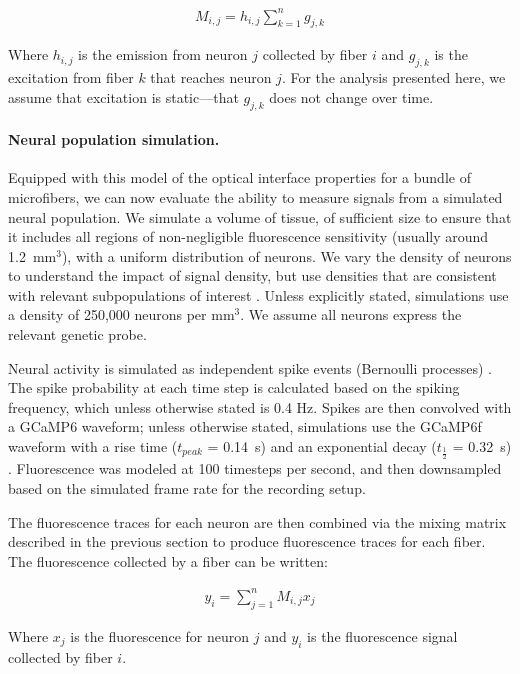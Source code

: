 \begin{align}
M_{i, j} = h_{i, j} \sum_{k = 1}^n g_{j, k}	
\end{align}


Where $h_{i, j}$ is the emission from neuron $j$ collected by fiber $i$ and $g_{j, k}$ is the excitation from fiber $k$ that reaches neuron $j$. For the analysis presented here, we assume that excitation is static---that $g_{j, k}$ does not change over time.

\paragraph{Neural population simulation.} Equipped with this model of the optical interface properties for a bundle of microfibers, we can now evaluate the ability to measure signals from a simulated neural population. We simulate a volume of tissue, of sufficient size to ensure that it includes all regions of non-negligible fluorescence sensitivity (usually around 1.2~mm$^3$), with a uniform distribution of neurons. We vary the density of neurons to understand the impact of signal density, but use densities that are consistent with relevant subpopulations of interest \cite{Walton:2012fj,KosubekLanger:2017jb}. Unless explicitly stated, simulations use a density of 250,000 neurons per mm$^3$. We assume all neurons express the relevant genetic probe.

Neural activity is simulated as independent spike events (Bernoulli processes) \cite{Kass2014}. The spike probability at each time step is calculated based on the spiking frequency, which unless otherwise stated is 0.4 Hz. Spikes are then convolved with a GCaMP6 waveform; unless otherwise stated, simulations use the GCaMP6f waveform with a rise time ($t_{peak}$ = 0.14~s) and an exponential decay ($t_{\frac{1}{2}}$ = 0.32~s) \cite{Chen:2013fc}. Fluorescence was modeled at 100 timesteps per second, and then downsampled based on the simulated frame rate for the recording setup.

The fluorescence traces for each neuron are then combined via the mixing matrix described in the previous section to produce fluorescence traces for each fiber. The fluorescence collected by a fiber can be written:

\begin{align}
y_i = \sum_{j = 1}^{n} M_{i, j} x_j
\end{align}

Where $x_j$ is the fluorescence for neuron $j$ and $y_i$ is the fluorescence signal collected by fiber $i$.


